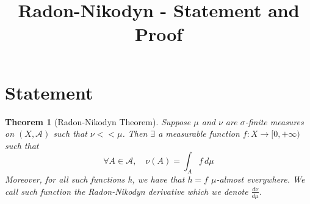 \documentclass[11pt]{article}
\title{Radon-Nikodyn - Statement and Proof}
\author{}
\date{}
\newcommand{\dm}{\ensuremath{\,d\mu}}
\newcommand{\mdf}[1]{{\color{red} #1}}
\newtheorem{theorem}{Theorem}[section]
\begin{document}
\maketitle
\section{Statement}
\begin{theorem}[Radon-Nikodyn Theorem]
Suppose $\mu$ and $\nu$ are $\sigma$-finite measures on $(X, \mathcal{A})$ such that $\nu << \mu$.
Then $\exists$ a measurable function $f: X \to [0, +\infty)$ such that
\[
	\forall A \in \mathcal{A}, \quad \nu(A)=\int_A f \dm
\]
Moreover, for all such functions h, we have that $h=f$ $\mu$-almost everywhere.
We call such function the \mdf{Radon-Nikodyn derivative} which we denote $\frac{d\nu}{d\mu}$.
\end{theorem}
\end{document}
